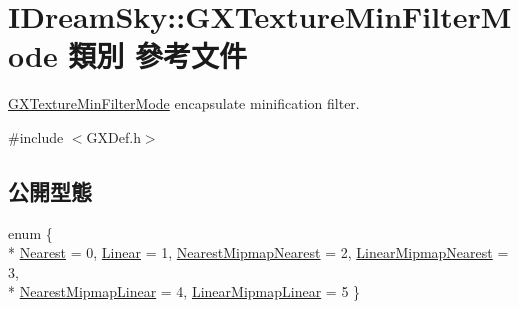 \hypertarget{class_i_dream_sky_1_1_g_x_texture_min_filter_mode}{}\section{I\+Dream\+Sky\+:\+:G\+X\+Texture\+Min\+Filter\+Mode 類別 參考文件}
\label{class_i_dream_sky_1_1_g_x_texture_min_filter_mode}


\hyperlink{class_i_dream_sky_1_1_g_x_texture_min_filter_mode}{G\+X\+Texture\+Min\+Filter\+Mode} encapsulate minification filter.  




{\ttfamily \#include $<$G\+X\+Def.\+h$>$}

\subsection*{公開型態}
\begin{DoxyCompactItemize}
\item 
enum \{ \\*
\hyperlink{class_i_dream_sky_1_1_g_x_texture_min_filter_mode_a53c413523e4864a1449a6d35f597d169a97c1fcc73df57d0c2c50d67dd077074e}{Nearest} = 0, 
\hyperlink{class_i_dream_sky_1_1_g_x_texture_min_filter_mode_a53c413523e4864a1449a6d35f597d169a7b6c588f524f66f9122174ee280039cf}{Linear} = 1, 
\hyperlink{class_i_dream_sky_1_1_g_x_texture_min_filter_mode_a53c413523e4864a1449a6d35f597d169ab60416772a1a8edd296763aaadf25a56}{Nearest\+Mipmap\+Nearest} = 2, 
\hyperlink{class_i_dream_sky_1_1_g_x_texture_min_filter_mode_a53c413523e4864a1449a6d35f597d169aa617656e278ede9c5fde031f06690f9f}{Linear\+Mipmap\+Nearest} = 3, 
\\*
\hyperlink{class_i_dream_sky_1_1_g_x_texture_min_filter_mode_a53c413523e4864a1449a6d35f597d169aac76bf49bb8498d3522213755c26daf0}{Nearest\+Mipmap\+Linear} = 4, 
\hyperlink{class_i_dream_sky_1_1_g_x_texture_min_filter_mode_a53c413523e4864a1449a6d35f597d169a4203be07e01d0b2c050d7b37cd2439fc}{Linear\+Mipmap\+Linear} = 5
 \}
\end{DoxyCompactItemize}
